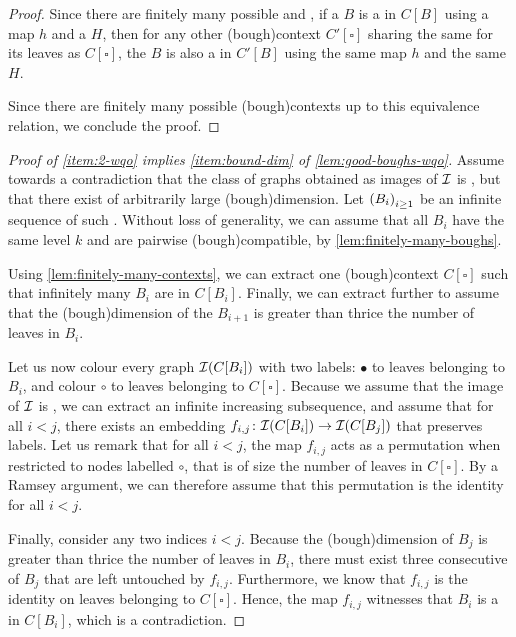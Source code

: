 \begin{proof}
  Since there are finitely many possible 
  and , if a  $B$ is a  in $C[B]$
  using a map $h$ and a  $H$,
  then for any other \kl(bough){context} $C'[\square]$ sharing the same
   for its leaves as $C[\square]$,
  the  $B$ is also a  in $C'[B]$
  using the same map $h$ and the same  $H$.

  Since there are finitely many possible \kl(bough){contexts} up to this 
  equivalence relation, we conclude the proof.
\end{proof}

\begin{proof}[Proof of \cref{item:2-wqo} implies \cref{item:bound-dim} of \cref{lem:good-boughs-wqo}]

  Assume towards a contradiction that the class of graphs obtained as images of
  $\mathcal{I}$ is , but that there exist  of arbitrarily large \kl(bough){dimension}. Let $\seqof{B_i}[i \geq 1]$
  be an infinite sequence of such . Without loss of generality,
  we can assume that all  $B_i$ have the same level $k$ and are
  pairwise \kl(bough){compatible}, by \cref{lem:finitely-many-boughs}.

  Using \cref{lem:finitely-many-contexts}, we can extract one \kl(bough){context}
  $C[\square]$ such that infinitely many  $B_i$ are 
  in $C[B_i]$. Finally, we can extract further to assume that 
  the \kl(bough){dimension} of the  $B_{i+1}$ 
  is greater than thrice the number of leaves in $B_i$.

  Let us now colour every graph $\mathcal{I}(C[B_i])$ with two labels: $\bullet$
  to leaves belonging to $B_i$, and colour $\circ$ to leaves belonging to
  $C[\square]$. Because we assume that the image of $\mathcal{I}$ is
  , we can extract an infinite increasing
  subsequence, and assume that for all $i < j$, there exists an embedding $f_{i,j}
  \colon \mathcal{I}(C[B_i]) \to \mathcal{I}(C[B_j])$ that preserves labels.
  Let us remark that for all $i < j$, the map 
  $f_{i,j}$ acts as a permutation when restricted to nodes labelled $\circ$,
  that is of size the number of leaves in $C[\square]$.
  By a Ramsey argument, we can therefore assume that this permutation is the identity
  for all $i < j$.

  Finally, consider any two indices $i < j$. 
  Because the \kl(bough){dimension} of $B_j$ is greater than thrice the number of leaves
  in $B_i$, there must exist three consecutive  of $B_j$ that are left untouched by $f_{i,j}$.
  Furthermore, we know that $f_{i,j}$ is the identity on leaves
  belonging to $C[\square]$. Hence, the map $f_{i,j}$
  witnesses that $B_i$ is a  in $C[B_i]$, which is a contradiction.
\end{proof}

